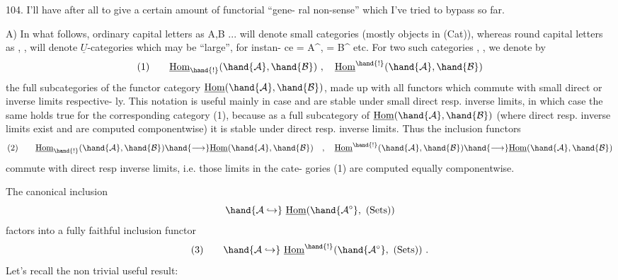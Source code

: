 
104.    I'll have after all to give a certain amount of functorial ``gene-%
ral non-sense''  which I've tried to bypass so far.

A)  In what follows,  ordinary capital letters as A,B ... will  denote
small categories (mostly objects in (Cat)),  whereas round capital letters
as ,  ,   will denote  $\underline{U}$-categories which may be ``large'',  for instan-%
ce = A\^{}, = B\^{} etc.   For two such categories  ,  ,  we denote by
\[ (1) \qquad \underline{\mathrm{Hom}}_{\hand{!}}(\hand{\mathcal{A}},\hand{\mathcal{B}}) \ , \quad \underline{\mathrm{Hom}}^{\hand{!}}(\hand{\mathcal{A}},\hand{\mathcal{B}}) \]
the full subcategories of the functor category $\underline{\mathrm{Hom}}(\hand{\mathcal{A}},\hand{\mathcal{B}})$,  made up with
all functors which commute with small direct or inverse limits respective-%
ly.  This notation is useful mainly in case  and  are stable under
small direct resp. inverse limits,  in which case the same holds true for
the corresponding category (1),  because as a full subcategory of
$\underline{\mathrm{Hom}}(\hand{\mathcal{A}},\hand{\mathcal{B}})$ (where direct resp. inverse limits exist and are computed
componentwise) it is stable under direct resp. inverse limits.  Thus the
inclusion functors
\[ (2) \qquad \underline{\mathrm{Hom}}_{\hand{!}}(\hand{\mathcal{A}},\hand{\mathcal{B}}) \hand{\longrightarrow} \underline{\mathrm{Hom}}(\hand{\mathcal{A}},\hand{\mathcal{B}}) \quad , \quad \underline{\mathrm{Hom}}^{\hand{!}}(\hand{\mathcal{A}},\hand{\mathcal{B}}) \hand{\longrightarrow} \underline{\mathrm{Hom}}(\hand{\mathcal{A}},\hand{\mathcal{B}}) \]
commute with direct resp inverse limits,  i.e. those limits in the cate-%
gories (1) are computed equally componentwise.

The canonical inclusion
\[ \hand{\mathcal{A} \hookrightarrow} \ \underline{\mathrm{Hom}}(\hand{\mathcal{A}^{\circ}},\ (\mathrm{Sets})) \]
factors into a fully faithful inclusion functor
\[ (3) \qquad \hand{\mathcal{A} \hookrightarrow} \ \underline{\mathrm{Hom}}^{\hand{!}}(\hand{\mathcal{A}^{\circ}},\ (\mathrm{Sets})) \ . \]
Let's recall the non trivial useful result:

